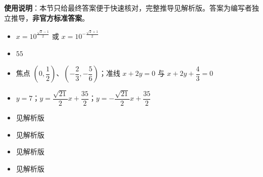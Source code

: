
\begin{gknotice}
\textbf{使用说明}：本节只给最终答案便于快速核对，完整推导见解析版。答案为编写者独立推导，\textbf{非官方标准答案}。
\end{gknotice}

\begin{itemize}[leftmargin=2.6em]
  \item[\textbf{1.}] $x=10^{\frac{\sqrt2-1}{2}}$ 或 $x=10^{-\frac{\sqrt2+1}{2}}$
  \item[\textbf{2.}] $55$
  \item[\textbf{3.}] 焦点 $\left(0,\dfrac12\right)$、$\left(-\dfrac23,-\dfrac56\right)$；准线 $x+2y=0$ 与 $x+2y+\dfrac43=0$
  \item[\textbf{4.}] $y=7$；$y=\dfrac{\sqrt{21}}2x+\dfrac{35}2$；$y=-\dfrac{\sqrt{21}}2x+\dfrac{35}2$
  \item[\textbf{5.}] 见解析版
  \item[\textbf{6.}] 见解析版
  \item[\textbf{7.}] 见解析版
  \item[\textbf{8.}] 见解析版
\end{itemize}
